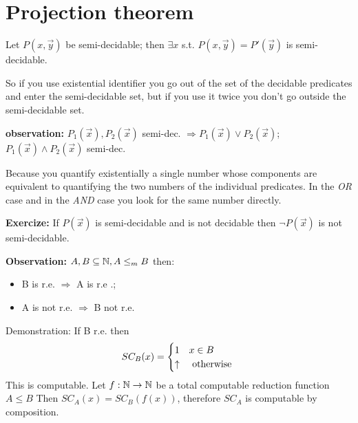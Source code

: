 \section {Projection theorem}

Let $ P(x,\vec{y}) $ be semi-decidable; then $ \exists x $ s.t. $
P(x,\vec{y}) = P'(\vec{y})$ is semi-decidable.

So if you use existential identifier you go out of the set of the
decidable predicates and enter the semi-decidable set, but if you use
it twice you don't go outside the semi-decidable set.

\textbf{observation:} $ P_1(\vec{x}), P_2(\vec{x}) $ semi-dec. $
\Rightarrow P_1(\vec{x}) \lor P_2(\vec{x}) $; $ P_1(\vec{x}) \land
P_2(\vec{x}) $ semi-dec.

Because you quantify existentially a single number whose components
are equivalent to quantifying the two numbers of the individual
predicates. In the \textit{OR} case and in the \textit{AND} case you
look for the same number directly.

\textbf{Exercize:} If $ P(\vec{x}) $ is semi-decidable and is not
decidable then $ \lnot P(\vec{x}) $ is not semi-decidable.

\textbf{Observation:} $ A,B \subseteq \mathbb{N}, A\leq_m B $ then:
\begin{itemize}
\item B is r.e. $ \Rightarrow $ A is r.e .;
\item A is not r.e. $ \Rightarrow $ B not r.e.
\end{itemize} Demonstration: If B r.e. then
\begin{equation*} SC_B(x) = \begin{cases} 1 & x \in B \\ \uparrow & $
    otherwise $
  \end{cases}
\end{equation*} This is computable. Let $ f:\mathbb{N}\rightarrow\mathbb{N} $ be a
total computable reduction function\\ $ A\leq B $ Then $ SC_A(x) =
SC_B(f(x)) $, therefore $ SC_A $ is computable by composition.

